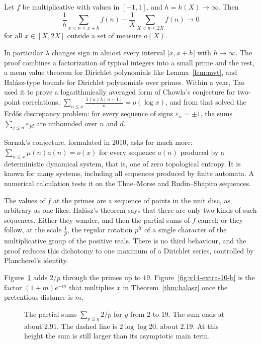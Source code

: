 \begin{theorem}\label{thm:mr}
Let $f$ be multiplicative with values in $[-1,1]$, and $h=h(X)\to\infty$. Then
\[
\frac1h\sum_{x<n\le x+h}f(n)-\frac1X\sum_{X<n\le2X}f(n)\longrightarrow0
\]
for all $x\in[X,2X]$ outside a set of measure $o(X)$.
\end{theorem}

In particular $\lambda$ changes sign in almost every interval $]x,x+h]$ with $h\to\infty$. The proof combines a factorization of typical integers into a small prime and the rest, a mean value theorem for Dirichlet polynomials like Lemma~\ref{lem:mvt}, and Halász-type bounds for Dirichlet polynomials over primes. Within a year, Tao used it to prove a logarithmically averaged form of Chowla's conjecture for two-point correlations, $\sum_{n\le x}\frac{\lambda(n)\lambda(n+1)}n=o(\log x)$, and from that solved the Erdős discrepancy problem: for every sequence of signs $\varepsilon_n=\pm1$, the sums $\sum_{j\le n}\varepsilon_{jd}$ are unbounded over $n$ and $d$.

Sarnak's conjecture, formulated in 2010, asks for much more: $\sum_{n\le x}\mu(n)a(n)=o(x)$ for every sequence $a(n)$ produced by a deterministic dynamical system, that is, one of zero topological entropy. It is known for many systems, including all sequences produced by finite automata. A numerical calculation tests it on the Thue--Morse and Rudin--Shapiro sequences.

\begin{beauty}
The values of $f$ at the primes are a sequence of points in the unit disc, as arbitrary as one likes. Halász's theorem says that there are only two kinds of such sequences. Either they wander, and then the partial sums of $f$ cancel; or they follow, at the scale $\frac1p$, the regular rotation $p^{it}$ of a single character of the multiplicative group of the positive reals. There is no third behaviour, and the proof reduces this dichotomy to one maximum of a Dirichlet series, controlled by Plancherel's identity.
\end{beauty}

Figure~\ref{fig:v14-extra-10-a} adds $2/p$ through the primes up to $19$. Figure~\ref{fig:v14-extra-10-b} is the factor $(1+m)e^{-m}$ that multiplies $x$ in Theorem~\ref{thm:halasz} once the pretentious distance is $m$.

\begin{figure}[ht]
\centering
{}
\caption{The partial sums $\sum_{p\le y}2/p$ for $y$ from $2$ to $19$. The sum ends at about $2.91$. The dashed line is $2\log\log 20$, about $2.19$. At this height the sum is still larger than its asymptotic main term.}
\label{fig:v14-extra-10-a}
\end{figure}

